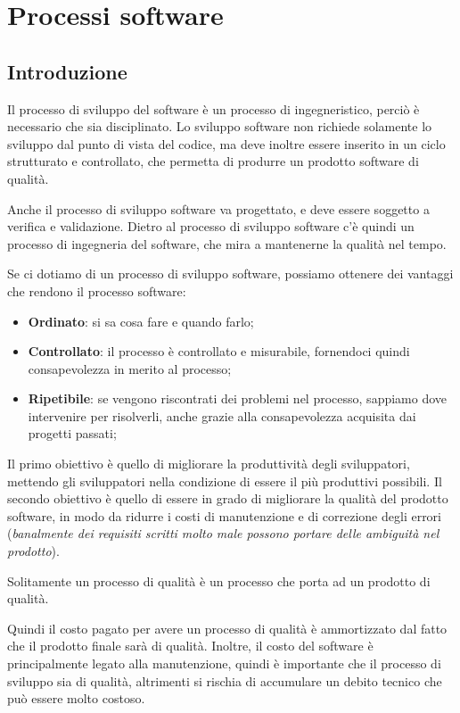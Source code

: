 \chapter{Processi software}
\section{Introduzione}
Il processo di sviluppo del software è un processo di
ingegneristico, perciò è necessario che sia disciplinato.
Lo sviluppo software non richiede solamente lo sviluppo dal punto di 
vista del codice, ma deve inoltre essere
inserito in un ciclo strutturato e controllato, che permetta di
produrre un prodotto software di qualità.

Anche il processo di sviluppo software va progettato, e deve essere
soggetto a verifica e validazione. Dietro al processo di sviluppo
software c'è quindi un processo di ingegneria del software, che
mira a mantenerne la qualità nel tempo.

Se ci dotiamo di un processo di sviluppo software, possiamo
ottenere dei vantaggi che rendono il processo software:
\begin{itemize}
\item \textbf{Ordinato}: si sa cosa fare e quando farlo;
\item \textbf{Controllato}: il processo è controllato e misurabile, fornendoci 
quindi consapevolezza in merito al processo;
\item \textbf{Ripetibile}: se vengono riscontrati dei problemi nel processo,
sappiamo dove intervenire per risolverli, anche grazie alla consapevolezza 
acquisita dai progetti passati;
\end{itemize}
Il primo obiettivo è quello di migliorare la produttività degli sviluppatori, mettendo 
gli sviluppatori nella condizione di essere il più produttivi possibili. 
Il secondo obiettivo è quello di essere in grado di migliorare la qualità del prodotto
software, in modo da ridurre i costi di manutenzione e di correzione degli errori 
(\textit{banalmente dei requisiti scritti molto male possono portare delle ambiguità 
nel prodotto}).
\begin{tcolorbox}
    Solitamente un processo di qualità è un processo che porta ad un prodotto di qualità.
\end{tcolorbox}
Quindi il costo pagato per avere un processo di qualità è ammortizzato dal fatto che
il prodotto finale sarà di qualità. Inoltre, il costo del software è principalmente
legato alla manutenzione, quindi è importante che il processo di sviluppo sia di qualità,
altrimenti si rischia di accumulare un debito tecnico che può essere molto costoso.

